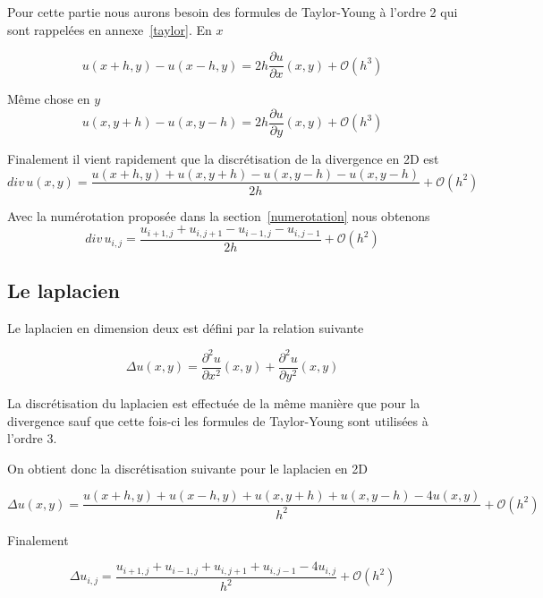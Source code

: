 \documentclass[twoside,12pt]{report}
\theoremstyle{remark}
\begin{document}
Pour cette partie nous aurons besoin des formules de Taylor-Young à l'ordre 2 qui sont rappelées en annexe~\ref{taylor}. En $x$

\begin{equation*}
u(x+h,y)-u(x-h,y)=2h\frac{\partial u}{\partial x}(x,y)+\mathcal{O}(h^3)
\end{equation*}

Même chose en $y$
\begin{equation*}
u(x,y+h)-u(x,y-h)=2h\frac{\partial u}{\partial y}(x,y)+\mathcal{O}(h^3)
\end{equation*}

Finalement il vient rapidement que la discrétisation de la divergence en 2D est
\begin{equation*}
div\, u(x,y)=\frac{u(x+h,y)+u(x,y+h)-u(x,y-h)-u(x,y-h)}{2h}+\mathcal{O}(h^2)
\end{equation*}

Avec la numérotation proposée dans la section~\ref{numerotation} nous obtenons
\begin{equation}
div\, u_{i,j}=\frac{u_{i+1,j}+u_{i,j+1}-u_{i-1,j}-u_{i,j-1}}{2h}+\mathcal{O}(h^2) \label{div}
\end{equation}

\subsection{Le laplacien}

Le laplacien en dimension deux est défini par la relation suivante

\begin{equation*}
\Delta u(x,y)=\frac{\partial^{2}u}{\partial x^2}(x,y)+\frac{\partial^{2}u}{\partial y^2}(x,y)
\end{equation*}

La discrétisation du laplacien est effectuée de la même manière que pour la divergence sauf que cette fois-ci les formules de Taylor-Young sont utilisées à l'ordre 3.
 
On obtient donc la discrétisation suivante pour le laplacien en 2D

\begin{equation*}
\Delta u(x,y)=\frac{u(x+h,y)+u(x-h,y)+u(x,y+h)+u(x,y-h)-4u(x,y)}{h^2}+\mathcal{O}(h^2)
\end{equation*}

Finalement

\begin{equation}
\Delta u_{i,j}=\frac{u_{i+1,j}+u_{i-1,j}+u_{i,j+1}+u_{i,j-1}-4u_{i,j}}{h^2}+\mathcal{O}(h^2) \label{lapla}
\end{equation}
\end{document}
